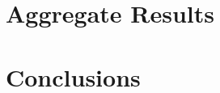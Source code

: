 \documentclass[review]{elsarticle}
\begin{document}
    \section{Aggregate Results}


    \section{Conclusions}






        
\end{document}
